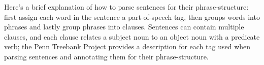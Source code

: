 Here's a brief explanation of how to parse sentences for their phrase-structure: first assign each word in the sentence a part-of-speech tag,
then groups words into phrases and lastly group phrases into clauses. Sentences can contain multiple clauses, and each clause relates a
subject noun to an object noun with a predicate verb; the Penn Treebank Project provides a description for each tag used when parsing sentences
and annotating them for their phrase-structure.
